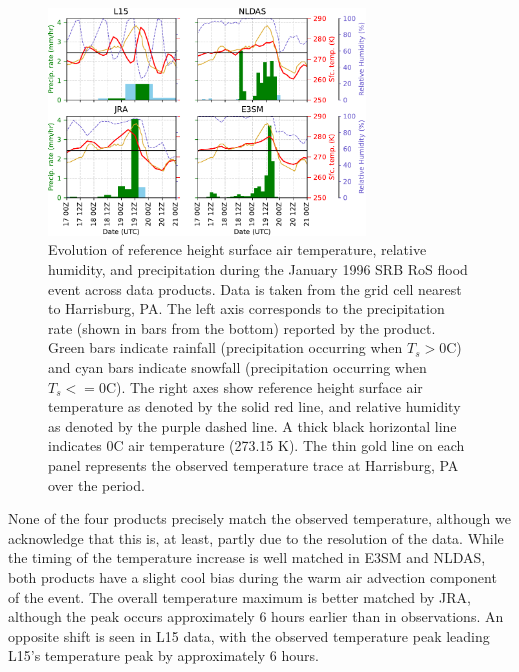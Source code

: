 \documentclass[nhess, manuscript]{copernicus}
\begin{document}
\begin{figure}
\noindent\includegraphics[width=0.75\textwidth]{figs/cropped/precip_vs_t_1996.pdf}
\caption{Evolution of reference height surface air temperature, relative humidity, and precipitation during the January 1996 SRB RoS flood event across data products. Data is taken from the grid cell nearest to Harrisburg, PA. The left axis corresponds to the precipitation rate (shown in bars from the bottom) reported by the product. Green bars indicate rainfall (precipitation occurring when $T_s > 0$\degree{}C) and cyan bars indicate snowfall (precipitation occurring when $T_s <= 0$\degree{}C). The right axes show reference height surface air temperature as denoted by the solid red line, and relative humidity as denoted by the purple dashed line. A thick black horizontal line indicates 0\degree{}C air temperature (273.15 K). The thin gold line on each panel represents the observed temperature trace at Harrisburg, PA over the period.}
\label{fig:1996eventtrace}
\end{figure}

None of the four products precisely match the observed temperature, although we acknowledge that this is, at least, partly due to the resolution of the data.
While the timing of the temperature increase is well matched in E3SM and NLDAS, both products have a slight cool bias during the warm air advection component of the event.
The overall temperature maximum is better matched by JRA, although the peak occurs approximately 6 hours earlier than in observations. An opposite shift is seen in L15 data, with the observed temperature peak leading L15's temperature peak by approximately 6 hours.
\end{document}

